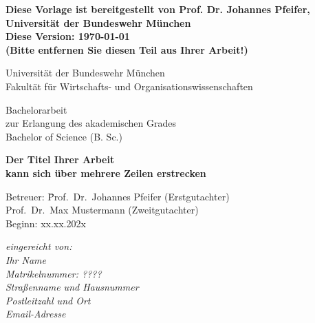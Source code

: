 \documentclass[a4paper,12pt]{scrartcl} %
\begin{document}


\begin{titlepage}

\thispagestyle{empty}   %
\begin{center}
\textbf{
Diese Vorlage ist bereitgestellt von Prof. Dr. Johannes Pfeifer, Universität der Bundeswehr München\\
Diese Version: \today \\
(Bitte entfernen Sie diesen Teil aus Ihrer Arbeit!)
}
\end{center}


\begin{center}

\vspace*{0.5cm}
Universität der Bundeswehr München\\
Fakultät für Wirtschafts- und Organisationswissenschaften\\
\vspace{2.5cm}

{\Large{Bachelorarbeit}}\\
zur Erlangung des akademischen Grades\\
Bachelor of Science (B. Sc.)\\

\vspace{0.5cm}

\vspace*{1cm}
{\textbf{\Large{Der Titel Ihrer Arbeit\\kann sich über mehrere Zeilen erstrecken}}} \\
\vspace*{1cm}


\end{center}

\vspace*{2cm}

\begin{tabbing}
Betreuer: \= Prof.\ Dr.\ Johannes Pfeifer (Erstgutachter)\\
 \>  Prof.\ Dr.\ Max Mustermann (Zweitgutachter)\\
Beginn:	\> xx.xx.202x
\end{tabbing}
\vspace*{0.5cm}



\vfill
\begin{flushleft}
   \emph{eingereicht von:} \\
   \emph{Ihr Name} \\
   \emph{Matrikelnummer: ????}\\
   \vspace*{0.5cm}
    \emph{Straßenname und Hausnummer}\\
    \emph{Postleitzahl und Ort}\\
   \emph{Email-Adresse}\\
\end{flushleft}



\end{titlepage}
\end{document}
